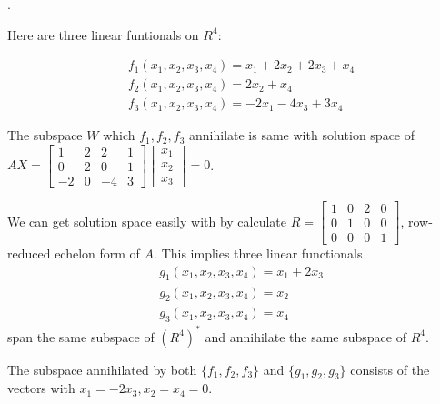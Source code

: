 \documentclass[8pt]{beamer}
\begin{document}
\begin{frame}{.}
    \begin{example}
        Here are three linear funtionals on $R^4$:

        \[
        \begin{aligned}
            &f_1 (x_1, x_2, x_3, x_4) = x_1 + 2x_2 + 2x_3 + x_4\\
            &f_2 (x_1, x_2, x_3, x_4) = 2x_2 + x_4\\
            &f_3 (x_1, x_2, x_3, x_4) = -2x_1 -4x_3 + 3x_4
        \end{aligned}
        \]

        The subspace $W$ which $f_1, f_2, f_3$ annihilate is same with solution space of $AX = \begin{bmatrix}
            1 & 2 & 2 & 1 \\ 0 & 2 & 0 & 1 \\ -2 &0 & -4 & 3
        \end{bmatrix} \begin{bmatrix}
        x_1 \\ x_2 \\ x_3
        \end{bmatrix} = 0$.

        We can get solution space easily with by calculate $R = \begin{bmatrix}
        1 & 0 & 2 &0 \\ 0 &1 & 0 & 0 \\ 0 & 0 & 0& 1
        \end{bmatrix}$, row-reduced echelon form of $A$.
        This implies three linear functionals
        \[
        \begin{aligned}
            &g_1(x_1, x_2, x_3, x_4) = x_1 + 2x_3 \\
            &g_2(x_1, x_2, x_3, x_4) = x_2 \\
            &g_3(x_1, x_2, x_3, x_4) = x_4
        \end{aligned}
        \]
        span the same subspace of $(R^4)^\ast$ and annihilate the same subspace of $R^4$.

        The subspace annihilated by both $\{f_1, f_2, f_3\}$ and $\{g_1, g_2, g_3\}$ consists of the vectors with $x_1 = -2 x_3, x_2=x_4 =0$.
    \end{example}
\end{frame}
\end{document}
